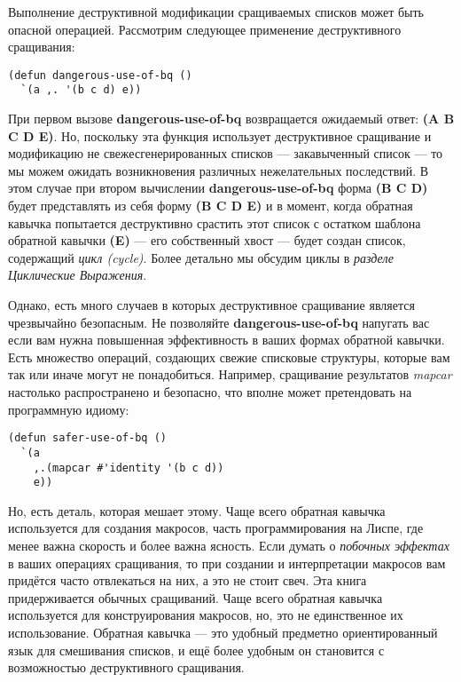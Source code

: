 Выполнение де\-струк\-тив\-ной модификации сращиваемых списков может быть опасной операцией. Рассмотрим следующее применение деструктивного сращивания:

\begin{verbatim}
(defun dangerous-use-of-bq ()
  `(a ,. '(b c d) e))
\end{verbatim}

При первом вызове \textbf{dangerous-use-of-bq} возвращается ожидаемый ответ: \textbf{(A B C D E)}. Но, поскольку эта функция использует деструктивное сращивание и модификацию не свежесгенерированных списков --- закавыченный список --- то мы можем ожидать возникновения различных нежелательных последствий. В этом случае при втором вычислении \textbf{dangerous-use-of-bq} форма \textbf{(B C D)} будет представлять из себя форму \textbf{(B C D E)} и в момент, когда обратная кавычка попытается деструктивно срастить этот список с остатком шаблона обратной кавычки \textbf{(E)} --- его собственный хвост --- будет создан список, содержащий \emph{цикл (cycle)}. Более детально мы обсудим циклы в \emph{разделе Циклические Выражения}.

Однако, есть много случаев в которых деструктивное сращивание является чрезвычайно безопасным. Не позволяйте \textbf{dangerous-use-of-bq} напугать вас если вам нужна повышенная эффективность в ваших формах обратной кавычки. Есть множество операций, создающих свежие списковые структуры, которые вам так или иначе могут не понадобиться. Например, сращивание результатов \emph{mapcar} настолько распространено и безопасно, что вполне может претендовать на программную идиому:

\begin{verbatim}
(defun safer-use-of-bq ()
  `(a
    ,.(mapcar #'identity '(b c d))
    e))
\end{verbatim}

Но, есть деталь, которая мешает этому. Чаще всего обратная кавычка используется для создания макросов, часть программирования на Лиспе, где менее важна скорость и более важна ясность. Если думать о \emph{побочных эффектах} в ваших операциях сращивания, то при создании и интерпретации макросов вам придётся часто отвлекаться на них, а это не стоит свеч. Эта книга придерживается обычных сращиваний. Чаще всего обратная кавычка используется для конструирования макросов, но, это не единственное их использование. Обратная кавычка --- это удобный предметно ориентированный язык для смешивания списков, и ещё более удобным он становится с возможностью деструктивного сращивания.

